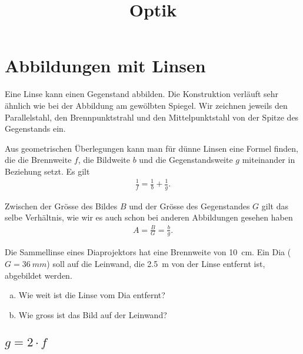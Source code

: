\documentclass[12pt,a4paper,twoside]{article}
\date{}
\title{Optik}
\begin{document}

\addtocounter{page}{2}
\addtocounter{section}{8}
\addtocounter{aufgabe}{26}


\section{Abbildungen mit Linsen}
Eine Linse kann einen Gegenstand abbilden. Die Konstruktion verläuft sehr ähnlich
wie bei der Abbildung am gewölbten Spiegel. Wir zeichnen jeweils den Parallelstahl,
den Brennpunktstrahl und den Mittelpunktstahl von der Spitze des Gegenstands ein.



Aus geometrischen Überlegungen kann man für dünne Linsen eine Formel finden,
die die Brennweite $f$, die Bildweite $b$ und die Gegenstandsweite $g$ miteinander
in Beziehung setzt. Es gilt
\begin{eqnarray*}
	\frac{1}{f} = \frac{1}{b} + \frac{1}{g}\text{.}
\end{eqnarray*}

Zwischen der Grösse des Bildes $B$ und der Grösse des Gegenstandes $G$ gilt das selbe Verhältnis,
wie wir es auch schon bei anderen Abbildungen gesehen haben
\begin{eqnarray*}
	A = \frac{B}{G} = \frac{b}{g}\text{.}
\end{eqnarray*}

\begin{aufgabe}
	Die Sammellinse eines Diaprojektors hat eine Brennweite von \SI{10}{cm}. Ein Dia ($G=\SI{36}{mm}$)
	soll auf die Leinwand, die \SI{2.5}{m} von der Linse entfernt ist, abgebildet werden.
	\begin{enumerate} [a)]
		\item Wie weit ist die Linse vom Dia entfernt?
		\item Wie gross ist das Bild auf der Leinwand?
	\end{enumerate}
\end{aufgabe}

\subsection*{$g=2\cdot f$}
\end{document}
